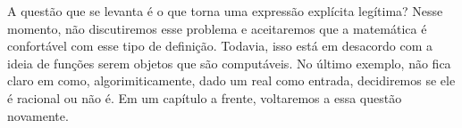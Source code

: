  A questão que se levanta é o que torna uma expressão explícita 
 legítima? Nesse momento, não discutiremos esse problema e 
 aceitaremos que a matemática é confortável com esse tipo de definição. 
 Todavia, isso está em desacordo com a ideia de funções serem 
 objetos que são computáveis. No último exemplo, não fica claro 
 em como, algorimiticamente, dado um real como entrada, decidiremos
 se ele é racional ou não é. Em um capítulo a frente, voltaremos a 
 essa questão novamente. 

